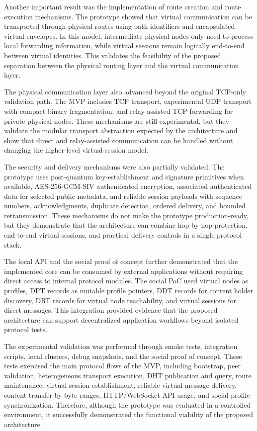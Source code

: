 \documentclass[12pt]{article}
\begin{document}
Another important result was the implementation of route creation and route execution mechanisms. The prototype showed that virtual communication can be transported through physical routes using path identifiers and encapsulated virtual envelopes. In this model, intermediate physical nodes only need to process local forwarding information, while virtual sessions remain logically end-to-end between virtual identities. This validates the feasibility of the proposed separation between the physical routing layer and the virtual communication layer.

The physical communication layer also advanced beyond the original TCP-only validation path. The MVP includes TCP transport, experimental UDP transport with compact binary fragmentation, and relay-assisted TCP forwarding for private physical nodes. These mechanisms are still experimental, but they validate the modular transport abstraction expected by the architecture and show that direct and relay-assisted communication can be handled without changing the higher-level virtual-session model.

The security and delivery mechanisms were also partially validated. The prototype uses post-quantum key-establishment and signature primitives when available, AES-256-GCM-SIV authenticated encryption, associated authenticated data for selected public metadata, and reliable session payloads with sequence numbers, acknowledgments, duplicate detection, ordered delivery, and bounded retransmission. These mechanisms do not make the prototype production-ready, but they demonstrate that the architecture can combine hop-by-hop protection, end-to-end virtual sessions, and practical delivery controls in a single protocol stack.

The local API and the social proof of concept further demonstrated that the implemented core can be consumed by external applications without requiring direct access to internal protocol modules. The social PoC used virtual nodes as profiles, DPT records as mutable profile pointers, DDT records for content holder discovery, DRT records for virtual node reachability, and virtual sessions for direct messages. This integration provided evidence that the proposed architecture can support decentralized application workflows beyond isolated protocol tests.

The experimental validation was performed through smoke tests, integration scripts, local clusters, debug snapshots, and the social proof of concept. These tests exercised the main protocol flows of the MVP, including bootstrap, peer validation, heterogeneous transport execution, DHT publication and query, route maintenance, virtual session establishment, reliable virtual message delivery, content transfer by byte ranges, HTTP/WebSocket API usage, and social profile synchronization. Therefore, although the prototype was evaluated in a controlled environment, it successfully demonstrated the functional viability of the proposed architecture.
\end{document}
